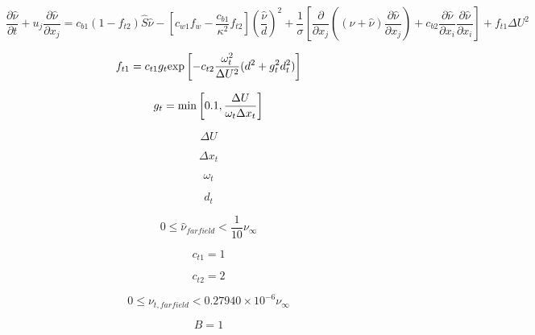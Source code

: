 

\begin{equation}
 \frac{\partial \hat \nu}{\partial t} + u_j \frac{\partial \hat \nu}{\partial x_j} =
    c_{b1}(1-f_{t2})\hat S \hat \nu -
    \left[c_{w1}f_w - \frac{c_{b1}}{\kappa^2}f_{t2}\right]
    \left(\frac{\hat \nu}{d} \right)^2 
  + \frac{1}{\sigma} \left[ \frac{\partial}{\partial x_j}
    \left( \left( \nu + \hat \nu \right) \frac{\partial \hat \nu}{\partial x_j} \right)
    + c_{b2}\frac{\partial \hat \nu}{\partial x_i} \frac{\partial \hat \nu}{\partial x_i}
    \right] + f_{t1} \Delta U^2
\label{Eq:saeqn}
\end{equation}

\begin{equation}
f_{t1} = c_{t1} g_t {\rm exp} \left[ -c_{t2} \frac{\omega_t^2}{\Delta U^2}(d^2 + g_t^2d_t^2) \right]
\end{equation}

\begin{equation}
g_t = {\rm min} \left[ 0.1, \frac{\Delta U}{\omega_t \Delta x_t} \right]
\end{equation}

\begin{equation}
\Delta U
\end{equation}

\begin{equation}
\Delta x_t
\end{equation}

\begin{equation}
\omega_t
\end{equation}

\begin{equation}
d_t
\end{equation}

\begin{equation}
0 \leq \hat \nu_{farfield} < \frac{1}{10}\nu_{\infty}
\end{equation}

\begin{equation}
c_{t1} = 1
\end{equation}

\begin{equation}
c_{t2} = 2
\end{equation}

\begin{equation}
0 \leq \nu_{t,farfield} < 0.27940 \times 10^{-6} \nu_{\infty}
\end{equation}

\begin{equation}
B=1
\end{equation}


